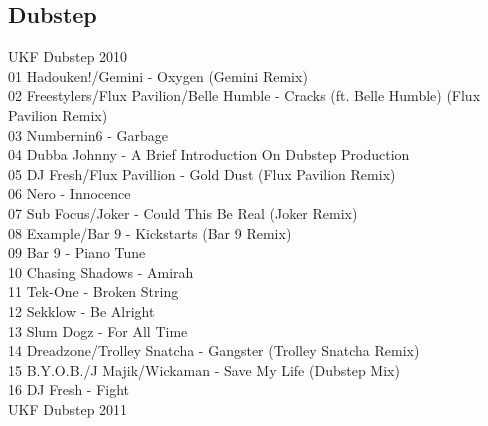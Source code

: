 \begin{multicols}{2}
 \section*{Dubstep}
 \large UKF Dubstep 2010 \normalsize\\
 01 Hadouken!/Gemini - Oxygen (Gemini Remix)\\ 02 Freestylers/Flux Pavilion/Belle Humble - Cracks (ft. Belle Humble) (Flux Pavilion Remix)\\ 03 Numbernin6 - Garbage\\ 04 Dubba Johnny - A Brief Introduction On Dubstep Production\\ 05 DJ Fresh/Flux Pavillion - Gold Dust (Flux Pavilion Remix)\\ 06 Nero - Innocence\\ 07 Sub Focus/Joker - Could This Be Real (Joker Remix)\\ 08 Example/Bar 9 - Kickstarts (Bar 9 Remix)\\ 09 Bar 9 - Piano Tune\\ 10 Chasing Shadows - Amirah\\ 11 Tek-One - Broken String\\ 12 Sekklow - Be Alright\\ 13 Slum Dogz - For All Time\\ 14 Dreadzone/Trolley Snatcha - Gangster (Trolley Snatcha Remix)\\ 15 B.Y.O.B./J Majik/Wickaman - Save My Life (Dubstep Mix)\\ 16 DJ Fresh - Fight\\
 \large UKF Dubstep 2011 \normalsize\\

\end{multicols}
